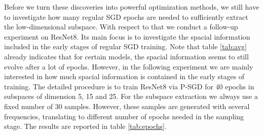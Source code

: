 \documentclass[11pt, a4paper]{article}
\begin{document}
Before we turn these discoveries into powerful optimization methods, we still have to investigate how many regular SGD epochs are needed to sufficiently extract the low-dimensional subspace. With respect to that we conduct a follow-up experiment on ResNet8. Its main focus is to investigate the spacial information included in the early stages of regular SGD training. Note that table \ref{tab:avg} already indicates that for certain models, the spacial information seems to still evolve after a lot of epochs. However, in the following experiment we are mainly interested in how much spacial information is contained in the early stages of training. The detailed procedure is to train ResNet8 via P-SGD for 40 epochs in subspaces of dimension 5, 15 and 25. For the subspace extraction we always use a fixed number of 30 samples. However, these samples are generated with several frequencies, translating to different number of epochs needed in the sampling stage. The results are reported in table \ref{tab:epochs}.

\end{document}
